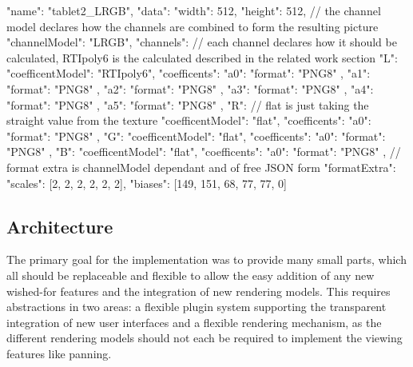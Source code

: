 \begin{json}
{
  "name": "tablet2_LRGB",
  "data": {
    "width": 512,
    "height": 512,
    // the channel model declares how the channels are combined to form the
    resulting picture
    "channelModel": "LRGB",
    "channels": {
      // each channel declares how it should be calculated, RTIpoly6 is the calculated described in the related work section
      "L": {
        "coefficentModel": "RTIpoly6",
        "coefficents": {
          "a0": { "format": "PNG8" },
          "a1": { "format": "PNG8" },
          "a2": { "format": "PNG8" },
          "a3": { "format": "PNG8" },
          "a4": { "format": "PNG8" },
          "a5": { "format": "PNG8" }
        }
      },
      "R": {
        // flat is just taking the straight value from the texture
        "coefficentModel": "flat",
        "coefficents": {
          "a0": { "format": "PNG8" }
        }
      },
      "G": {
        "coefficentModel": "flat",
        "coefficents": {
          "a0": { "format": "PNG8" }
        }
      },
      "B": {
        "coefficentModel": "flat",
        "coefficents": {
          "a0": { "format": "PNG8"}
        }
      }
    },
    // format extra is channelModel dependant and of free JSON form
    "formatExtra": {
      "scales": [2, 2, 2, 2, 2, 2],
      "biases": [149, 151, 68, 77, 77, 0]
    }
  }
}
\end{json}


\subsection{Architecture}
The primary goal for the implementation was to provide many small parts, which
all should be replaceable and flexible to allow the easy addition of any new
wished-for features and the integration of new rendering models. This requires
abstractions in two areas: a flexible plugin system supporting the transparent
integration of new user interfaces and a flexible rendering mechanism, as the
different rendering models should not each be required to implement the viewing
features like panning.

